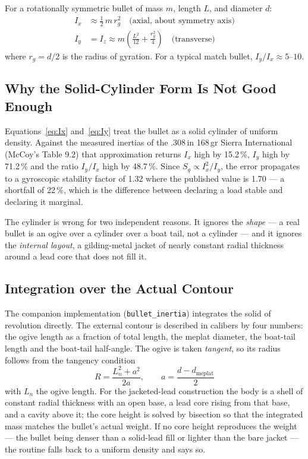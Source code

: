 \documentclass[11pt,twoside,openright]{report}
\begin{document}
For a rotationally symmetric bullet of mass $m$, length $L$, and diameter $d$:
\begin{align}
  I_x &\approx \frac{1}{2}\,m\,r_g^2 \quad \text{(axial, about symmetry axis)} \label{eq:Ix}\\
  I_y &= I_z \approx m\left(\frac{L^2}{12} + \frac{r_g^2}{4}\right) \quad \text{(transverse)} \label{eq:Iy}
\end{align}
where $r_g = d/2$ is the radius of gyration. For a typical match bullet, $I_y/I_x \approx 5$--$10$.

\subsection{Why the Solid-Cylinder Form Is Not Good Enough}

Equations~\eqref{eq:Ix} and~\eqref{eq:Iy} treat the bullet as a solid cylinder of
uniform density. Against the measured inertias of the .308\,in 168\,gr Sierra
International (McCoy's Table 9.2) that approximation returns $I_x$ high by
15.2\,\%, $I_y$ high by 71.2\,\% and the ratio $I_y/I_x$ high by 48.7\,\%. Since
$S_g \propto I_x^2/I_y$, the error propagates to a gyroscopic stability factor of
1.32 where the published value is 1.70 --- a shortfall of 22\,\%, which is the
difference between declaring a load stable and declaring it marginal.

The cylinder is wrong for two independent reasons. It ignores the \emph{shape} ---
a real bullet is an ogive over a cylinder over a boat tail, not a cylinder --- and
it ignores the \emph{internal layout}, a gilding-metal jacket of nearly constant
radial thickness around a lead core that does not fill it.

\subsection{Integration over the Actual Contour}

The companion implementation (\texttt{bullet\_inertia}) integrates the solid of
revolution directly. The external contour is described in calibers by four numbers:
the ogive length as a fraction of total length, the meplat diameter, the boat-tail
length and the boat-tail half-angle. The ogive is taken \emph{tangent}, so its
radius follows from the tangency condition
\begin{equation}
  R = \frac{L_n^2 + a^2}{2a}, \qquad a = \frac{d - d_{\mathrm{meplat}}}{2}
  \label{eq:tangent_ogive}
\end{equation}
with $L_n$ the ogive length. For the jacketed-lead construction the body is a shell
of constant radial thickness with an open base, a lead core rising from that base,
and a cavity above it; the core height is solved by bisection so that the integrated
mass matches the bullet's actual weight. If no core height reproduces the weight ---
the bullet being denser than a solid-lead fill or lighter than the bare jacket ---
the routine falls back to a uniform density and says so.
\end{document}
